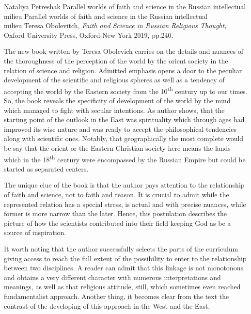 \begin{recplenv}{Nataliya Petreshak}
	{Parallel worlds of faith and science in the Russian intellectual milieu}
	{Parallel worlds of faith and science in the Russian intellectual\\milieu}
	{Teresa Obolevitch, \textit{Faith and Science in Russian Religious Thought}, Oxford University Press, Oxford-New York 2019,
		pp.240.}
 





The new book written by Teresa Obolevich carries on the details and nuances of the thoroughness of the
perception of the world by the orient society in the relation of science and religion. Admitted emphasis opens a door
to the peculiar development of the scientific and religious spheres as well as a tendency of accepting the world by the
Eastern society from the 10\textsuperscript{th}  century up to our times. So, the book reveals
the specificity of development of the world by the mind which managed to fight with secular intentions. As author
shows, that the starting point of the outlook in the East was spirituality which through ages had improved its wise
nature and was ready to accept the philosophical tendencies along with scientific ones. Notably, that geographically
the most complete would be say that the orient or the Eastern Christian society here means the lands which in the
18\textsuperscript{th} century were encompassed by the Russian Empire but could be started as separated centers.


The unique clue of the book is that the author pays attention to the relationship of faith and science, not to faith and
reason. It is crucial to admit while the represented relation has a special stress, is actual and with precise nuances,
while former is more narrow than the later. Hence, this postulation describes the picture of how the scientists
contributed into their field keeping God as be a source of inspiration.


It worth noting that the author successfully selects the parts of the curriculum giving access to reach the full extent
of the possibility to enter to the relationship between two disciplines. A reader can admit that this linkage is not
monotonous and obtains a very different character with numerous interpretations and meanings, as well as that religious
attitude, still, which sometimes even reached fundamentalist approach. Another thing, it becomes clear from the text
the contrast of the developing of this approach in the West and the East.



\end{recplenv}
